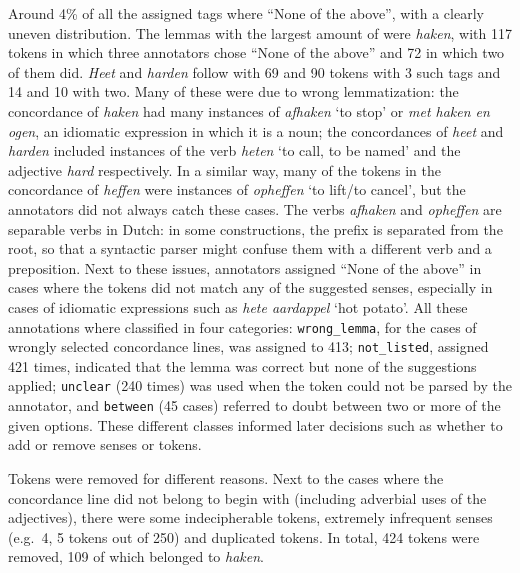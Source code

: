 \documentclass[
]{book}
\begin{document}
Around 4\% of all the assigned tags where ``None of the above'', with a clearly uneven distribution. The lemmas with the largest amount of were \emph{haken}, with 117 tokens in which three annotators chose ``None of the above'' and 72 in which two of them did. \emph{Heet} and \emph{harden} follow with 69 and 90 tokens with 3 such tags and 14 and 10 with two. Many of these were due to wrong lemmatization: the concordance of \emph{haken} had many instances of \emph{afhaken} `to stop' or \emph{met haken en ogen}, an idiomatic expression in which it is a noun; the concordances of \emph{heet} and \emph{harden} included instances of the verb \emph{heten} `to call, to be named' and the adjective \emph{hard} respectively. In a similar way, many of the tokens in the concordance of \emph{heffen} were instances of \emph{opheffen} `to lift/to cancel', but the annotators did not always catch these cases. The verbs \emph{afhaken} and \emph{opheffen} are separable verbs in Dutch: in some constructions, the prefix is separated from the root, so that a syntactic parser might confuse them with a different verb and a preposition. Next to these issues, annotators assigned ``None of the above'' in cases where the tokens did not match any of the suggested senses, especially in cases of idiomatic expressions such as \emph{hete aardappel} `hot potato'. All these annotations where classified in four categories: \texttt{wrong\_lemma}, for the cases of wrongly selected concordance lines, was assigned to 413; \texttt{not\_listed}, assigned 421 times, indicated that the lemma was correct but none of the suggestions applied; \texttt{unclear} (240 times) was used when the token could not be parsed by the annotator, and \texttt{between} (45 cases) referred to doubt between two or more of the given options. These different classes informed later decisions such as whether to add or remove senses or tokens.

Tokens were removed for different reasons. Next to the cases where the concordance line did not belong to begin with (including adverbial uses of the adjectives), there were some indecipherable tokens, extremely infrequent senses (e.g.~4, 5 tokens out of 250) and duplicated tokens. In total, 424 tokens were removed, 109 of which belonged to \emph{haken}.
\end{document}
